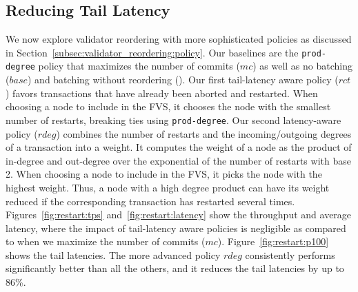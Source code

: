 \subsection{Reducing Tail Latency}
\label{subsec:experiment:policy}

We now explore validator reordering with more sophisticated policies as discussed in Section~\ref{subsec:validator_reordering:policy}.
Our baselines are the \texttt{prod-degree} policy that maximizes the number of commits ($mc$) as well as no batching ($base$) and batching without reordering (). 
Our first tail-latency aware policy ($rct$) favors transactions that have already been aborted and restarted. When choosing a node to include in the FVS, it chooses the node with the smallest number of restarts, breaking ties using \texttt{prod-degree}.
Our second latency-aware policy ($rdeg$) combines the number of restarts and the incoming/outgoing degrees of a transaction into a weight. It computes the weight of a node as
the product of in-degree and out-degree over the exponential of the number of
restarts with base 2. When choosing a node to include in the FVS, it picks the node with the highest weight. Thus, a node with a high degree product can have its weight reduced if the corresponding transaction has restarted several times.
Figures~\ref{fig:restart:tps} and~\ref{fig:restart:latency} show the throughput
and average latency, where the impact of tail-latency aware policies is negligible as compared to when we maximize the number of commits ($mc$).
Figure~\ref{fig:restart:p100} shows the 
tail latencies. 
 The more advanced policy $rdeg$ consistently performs significantly better than all the others, and it reduces the tail latencies by up to 86\%.

